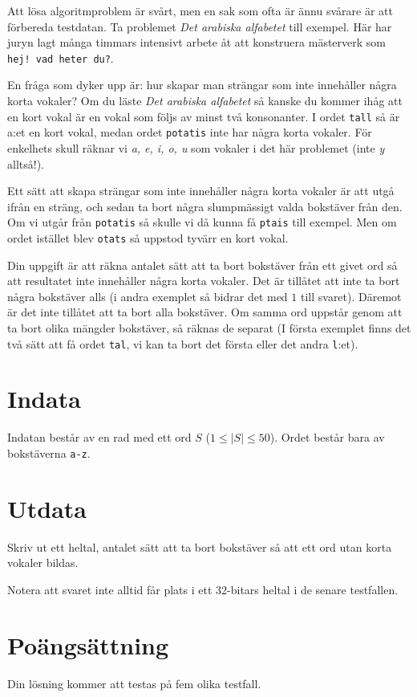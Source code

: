 
Att lösa algoritmproblem är svårt, men en sak som ofta är ännu svårare är att förbereda
testdatan. Ta problemet \textit{Det arabiska alfabetet} till exempel. Här har juryn lagt
många timmars intensivt arbete åt att konstruera mästerverk som \texttt{hej! vad heter du?}.


En fråga som dyker upp är: hur skapar man strängar som inte innehåller några korta vokaler?
Om du läste \textit{Det arabiska alfabetet} så kanske du kommer ihåg att en kort vokal är en
vokal som följs av minst två konsonanter. I ordet \texttt{tall} så är a:et en kort vokal, medan
ordet \texttt{potatis} inte har några korta vokaler. För enkelhets skull räknar vi  \textit{a, e, i, o, u} 
som vokaler i det här problemet (inte \textit{y} alltså!).


Ett sätt att skapa strängar som inte innehåller några korta vokaler är att utgå ifrån en sträng,
och sedan ta bort några slumpmässigt valda bokstäver från den. Om vi utgår från \texttt{potatis} så 
skulle vi då kunna få \texttt{ptais} till exempel. Men om ordet istället blev \texttt{otats} så uppstod
tyvärr en kort vokal.


Din uppgift är att räkna antalet sätt att ta bort bokstäver från ett givet ord så att resultatet inte
innehåller några korta vokaler. Det är tillåtet att inte ta bort några bokstäver alls (i andra exemplet
så bidrar det med $1$ till svaret). Däremot är det inte tillåtet att ta bort alla bokstäver. Om samma ord
uppstår genom att ta bort olika mängder bokstäver, så räknas de separat (I första exemplet finns det två sätt
att få ordet \texttt{tal}, vi kan ta bort det första eller det andra \texttt{l}:et).

\section*{Indata}
Indatan består av en rad med ett ord $S$ ($1 \leq |S| \leq 50$). Ordet består bara av bokstäverna \texttt{a-z}.

\section*{Utdata}
Skriv ut ett heltal, antalet sätt att ta bort bokstäver så att ett ord utan korta vokaler bildas.

Notera att svaret inte alltid får plats i ett $32$-bitars heltal i de senare testfallen.

\section*{Poängsättning}
Din lösning kommer att testas på fem olika testfall.

